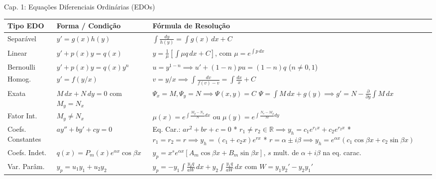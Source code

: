 \documentclass[11pt,a4paper]{article}
\newcommand{\R}{\mathbb{R}}
\begin{document}
\begin{definitionbox}[breakable, left=4pt, right=4pt, top=4pt, bottom=4pt, boxrule=0.6pt, colframe=primaryColor]{Cap. 1: Equações Diferenciais Ordinárias (EDOs)}
  \def\arraystretch{1.2}
  \begin{tabular}{|p{2.2cm}|p{4.2cm}|p{10.2cm}|}
    \hline
    \textbf{Tipo EDO} & \textbf{Forma / Condição} & \textbf{Fórmula de Resolução} \\ \hline
    Separável & $y' = g(x)h(y)$ & $\int \frac{dy}{h(y)} = \int g(x)\,dx + C$ \\ \hline
    Linear & $y' + p(x)y = q(x)$ & $y = \frac{1}{\mu} \left[ \int \mu q\,dx + C \right]$, com $\mu = e^{\int p\,dx}$ \\ \hline
    Bernoulli & $y' + p(x)y = q(x)y^n$ & $u = y^{1-n} \implies u' + (1-n)pu = (1-n)q$ ($n \neq 0, 1$) \\ \hline
    Homog. & $y' = f(y/x)$ & $v = y/x \implies \int \frac{dv}{f(v)-v} = \int \frac{dx}{x} + C$ \\ \hline
    Exata & $M\,dx + N\,dy = 0$ com $M_y = N_x$ & $\Psi_x = M, \Psi_y = N \implies \Psi(x,y)=C$ \newline
    $\Psi = \int M\,dx + g(y) \implies g' = N - \frac{\partial}{\partial y}\int M\,dx$ \\ \hline
    Fator Int. & $M_y \neq N_x$ & $\mu(x) = e^{\int \frac{M_y-N_x}{N}dx}$ ou $\mu(y) = e^{\int \frac{N_x-M_y}{M}dy}$ \\ \hline
    Coefs. Constantes & $a y'' + b y' + c y = 0$ & Eq. Car.: $a r^2 + b r + c = 0$ \newline
     * $r_1 \neq r_2 \in \R \implies y_h = c_1 e^{r_1 x} + c_2 e^{r_2 x}$ \newline
     * $r_1 = r_2 = r \implies y_h = (c_1 + c_2 x) e^{r x}$ \newline
     * $r = \alpha \pm i\beta \implies y_h = e^{\alpha x} (c_1\cos\beta x + c_2\sin\beta x)$ \\ \hline
    Coefs. Indet. & $q(x) = P_m(x)e^{\alpha x}\cos\beta x$ & $y_p = x^s e^{\alpha x}[A_m\cos\beta x + B_m\sin\beta x]$, \newline
     $s$ mult. de $\alpha+i\beta$ na eq. carac. \\ \hline
    Var. Parâm. & $y_p = u_1 y_1 + u_2 y_2$ & $y_p = -y_1 \int \frac{y_2 q}{a W}\,dx + y_2 \int \frac{y_1 q}{a W}\,dx$ com $W = y_1 y_2' - y_2 y_1'$ \\ \hline
  \end{tabular}
\end{definitionbox}
\end{document}
